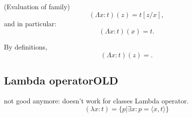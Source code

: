 \begin{theorem}(Evaluation of family)
\[
(\Lambda x: t)(z) = t[z/x],
\]
and in particular:
\[
(\Lambda x: t)(x) = t.
\]
\end{theorem}
\Proof
By definitions,
\[
(\Lambda x: t)(z) =.
\]


\Done

\subsection{Lambda operatorOLD}
\begin{definition}
\label{def:lambda operator}not good anymore: doesn't work for classes
Lambda operator.
\[
(\lambda x: t) = \{p|\exists x: p = \langle x,t \rangle\}
\]
\end{definition}

